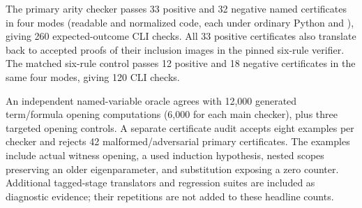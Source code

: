 The primary arity checker passes 33 positive and 32 negative named
certificates in four modes (readable and normalized code, each under
ordinary Python and ), giving 260 expected-outcome CLI
checks. All 33 positive certificates also translate back to accepted
proofs of their inclusion images in the pinned six-rule verifier.
The matched six-rule control passes 12 positive and 18 negative
certificates in the same four modes, giving 120 CLI checks.

An independent named-variable oracle agrees with 12,000 generated
term/formula opening computations (6,000 for each main checker), plus
three targeted opening controls. A separate certificate audit accepts
eight examples per checker and rejects 42 malformed/adversarial primary
certificates. The examples include actual witness opening, a used
induction hypothesis, nested scopes preserving an older eigenparameter,
and substitution exposing a zero counter. Additional tagged-stage
translators and regression suites are included as diagnostic evidence;
their repetitions are not added to these headline counts.
